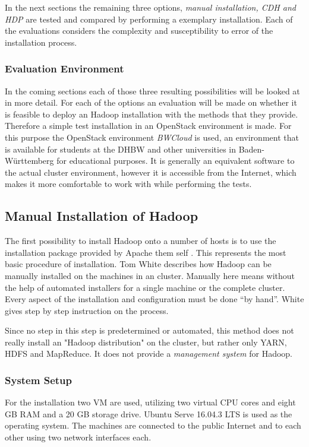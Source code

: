 In the next sections the remaining three options, 
\emph{manual installation, \ac{CDH} and \ac{HDP}}
are tested and compared by performing a exemplary installation.
Each of the evaluations considers the complexity and susceptibility to error of the installation process.


\subsubsection{Evaluation Environment}
In the coming sections each of those three resulting possibilities will be looked at in more detail.
For each of the options an evaluation will be made on whether it is 
feasible to deploy an Hadoop installation with the methods that they provide.
Therefore a simple test installation in an OpenStack environment is made.
For this purpose the OpenStack environment \emph{BWCloud} 
is used, an environment that is available for students at the \ac{DHBW} 
and other universities in Baden-Württemberg for educational purposes. 
It is generally an equivalent software to the actual cluster environment, 
however it is accessible from the Internet, 
which makes it more comfortable to work with while performing the tests.

\subsection{Manual Installation of Hadoop}
\label{sec:design:manualinstall}

The first possibility to install Hadoop onto a number of hosts 
is to use the installation package provided by Apache them self .
This represents the most basic procedure of installation.
Tom White \autocite[][Appendix A]{white2015hadoop} describes how Hadoop can be manually installed on the machines in an cluster. 
Manually here means without the help of automated installers for a single machine or the complete cluster. 
Every aspect of the installation and configuration must be done \enquote{by hand}.
White gives step by step instruction on the process.

Since no step in this step is predetermined or automated, this method does not really install an "Hadoop distribution" on the cluster, but rather only \ac{YARN}, \ac{HDFS} and MapReduce.
It does not provide a \emph{management system} for Hadoop.

\subsubsection{System Setup}
For the installation two \acs{VM} are used, utilizing two virtual \ac{CPU} cores and eight \ac{GB} \ac{RAM} and a 20 \ac{GB} storage drive. 
Ubuntu Serve 16.04.3 \ac{LTS} is used as the operating system. 
The machines are connected to the public Internet and to each other using two network interfaces each.

